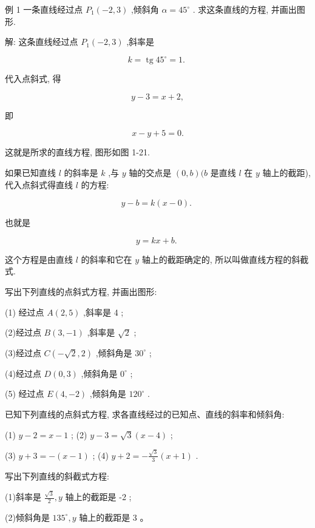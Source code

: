 \documentclass[lang=cn,newtx,12pt,scheme=chinese]{elegantbook}
\begin{document}
例 1 一条直线经过点 \({P}_{1}\left( {-2,3}\right)\) ,倾斜角 \(\alpha = {45}^{ \circ }\) . 求这条直线的方程, 并画出图形.

解: 这条直线经过点 \({P}_{1}\left( {-2,3}\right)\) ,斜率是

\[
  k = \operatorname{tg}{45}^{ \circ } = 1\text{. }
\]

代入点斜式, 得

\[
  y - 3 = x + 2,
\]

即

\[
  x - y + 5 = 0.
\]

这就是所求的直线方程, 图形如图 1-21.

如果已知直线 \(l\) 的斜率是 \(k\) ,与 \(y\) 轴的交点是 \(\left( {0,b}\right) (b\) 是直线 \(l\) 在 \(y\) 轴上的截距),代入点斜式得直线 \(l\) 的方程:

\[
  y - b = k\left( {x - 0}\right) \text{. }
\]

也就是
\begin{corollary}[斜截式]
\[
  y = {kx} + b\text{. }
\]
\end{corollary}
这个方程是由直线 \(l\) 的斜率和它在 \(y\) 轴上的截距确定的, 所以叫做直线方程的斜截式.

\begin{problemset}[练习]

\item 写出下列直线的点斜式方程, 并画出图形:

(1) 经过点 \(A\left( {2,5}\right)\) ,斜率是 4 ;

(2)经过点 \(B\left( {3, - 1}\right)\) ,斜率是 \(\sqrt{2}\) ;

(3)经过点 \(C\left( {-\sqrt{2},2}\right)\) ,倾斜角是 \({30}^{ \circ }\) ;

(4)经过点 \(D\left( {0,3}\right)\) ,倾斜角是 \({0}^{ \circ }\) ;

(5) 经过点 \(E\left( {4, - 2}\right)\) ,倾斜角是 \({120}^{ \circ }\) .

\item 已知下列直线的点斜式方程, 求各直线经过的已知点、直线的斜率和倾斜角:


(1) \(y - 2 = x - 1\) ; (2) \(y - 3 = \sqrt{3}\left( {x - 4}\right)\) ;


(3) \(y + 3 = - \left( {x - 1}\right)\) ; (4) \(y + 2 = - \frac{\sqrt{3}}{3}\left( {x + 1}\right)\) .

\item 写出下列直线的斜截式方程:

(1)斜率是 \(\frac{\sqrt{3}}{2},y\) 轴上的截距是 -2 ;

(2)倾斜角是 \({135}^{ \circ },y\) 轴上的截距是 3 。
\end{problemset}
\end{document}
